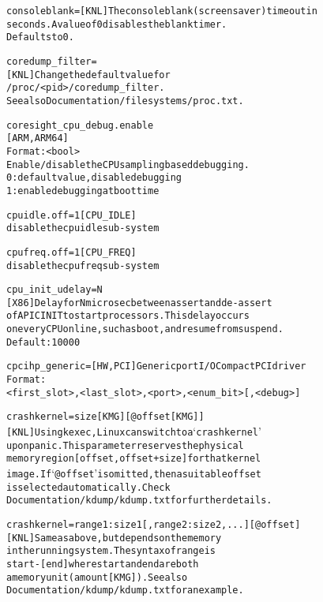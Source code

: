 \documentclass[a4paper,8pt,english]{sphinxmanual}
\begin{document}
\begin{alltt}
        consoleblank=   {[}KNL{]} The console blank (screen saver) timeout in
                        seconds. A value of 0 disables the blank timer.
                       Defaults to 0.

        coredump\_filter=
                        {[}KNL{]} Change the default value for
                        /proc/\textless{}pid\textgreater{}/coredump\_filter.
                        See also Documentation/filesystems/proc.txt.

        coresight\_cpu\_debug.enable
                        {[}ARM,ARM64{]}
                        Format: \textless{}bool\textgreater{}
                        Enable/disable the CPU sampling based debugging.
                        0: default value, disable debugging
                        1: enable debugging at boot time

        cpuidle.off=1   {[}CPU\_IDLE{]}
                        disable the cpuidle sub-system

        cpufreq.off=1   {[}CPU\_FREQ{]}
                        disable the cpufreq sub-system

        cpu\_init\_udelay=N
                        {[}X86{]} Delay for N microsec between assert and de-assert
                        of APIC INIT to start processors.  This delay occurs
                        on every CPU online, such as boot, and resume from suspend.
                        Default: 10000

        cpcihp\_generic= {[}HW,PCI{]} Generic port I/O CompactPCI driver
                        Format:
                        \textless{}first\_slot\textgreater{},\textless{}last\_slot\textgreater{},\textless{}port\textgreater{},\textless{}enum\_bit\textgreater{}{[},\textless{}debug\textgreater{}{]}

        crashkernel=size{[}KMG{]}{[}@offset{[}KMG{]}{]}
                        {[}KNL{]} Using kexec, Linux can switch to a `crash kernel'
                        upon panic. This parameter reserves the physical
                        memory region {[}offset, offset + size{]} for that kernel
                        image. If `@offset' is omitted, then a suitable offset
                        is selected automatically. Check
                        Documentation/kdump/kdump.txt for further details.

        crashkernel=range1:size1{[},range2:size2,...{]}{[}@offset{]}
                        {[}KNL{]} Same as above, but depends on the memory
                        in the running system. The syntax of range is
                        start-{[}end{]} where start and end are both
                        a memory unit (amount{[}KMG{]}). See also
                        Documentation/kdump/kdump.txt for an example.


\end{alltt}
\end{document}
